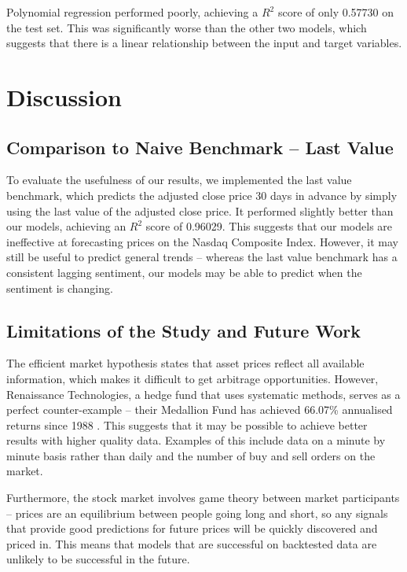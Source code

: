 \documentclass[a4paper, 11pt]{article}
\begin{document}
Polynomial regression performed poorly, achieving a $R^2$ score of only 0.57730 on the test set. This was significantly worse than the other two models, which suggests that there is a linear relationship between the input and target variables.

\section{Discussion}

\subsection{Comparison to Naive Benchmark -- Last Value}
To evaluate the usefulness of our results, we implemented the last value benchmark, which predicts the adjusted close price 30 days in advance by simply using the last value of the adjusted close price. It performed slightly better than our models, achieving an $R^2$ score of 0.96029. This suggests that our models are ineffective at forecasting prices on the Nasdaq Composite Index. However, it may still be useful to predict general trends -- whereas the last value benchmark has a consistent lagging sentiment, our models may be able to predict when the sentiment is changing.

\subsection{Limitations of the Study and Future Work}
The efficient market hypothesis states that asset prices reflect all available information, which makes it difficult to get arbitrage opportunities. However, Renaissance Technologies, a hedge fund that uses systematic methods, serves as a perfect counter-example -- their Medallion Fund has achieved 66.07\% annualised returns since 1988 \cite{cornell2020medallion}. This suggests that it may be possible to achieve better results with higher quality data. Examples of this include data on a minute by minute basis rather than daily and the number of buy and sell orders on the market.

Furthermore, the stock market involves game theory between market participants -- prices are an equilibrium between people going long and short, so any signals that provide good predictions for future prices will be quickly discovered and priced in. This means that models that are successful on backtested data are unlikely to be successful in the future.



\end{document}
